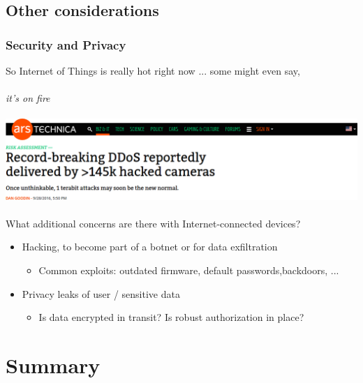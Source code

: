 \documentclass{beamer}
\begin{document}
\subsection{Other considerations}
\begin{frame}[fragile]
\frametitle{Security and Privacy}
So Internet of Things is really hot right now ...
 {
some might even say, \\
\hfill \\
{\centering \textit{it's on fire} \\
}  {
\hfill \\
\includegraphics[width=0.7\columnwidth]{external/hacked-headline} \\
\hfill \\
What additional concerns are there with Internet-connected devices?
}
}

 {
\begin{itemize}
  \item Hacking, to become part of a botnet or for data exfiltration
  \begin{itemize}
    \item Common exploits: outdated firmware, default passwords,backdoors, ...
  \end{itemize}
  \item Privacy leaks of user / sensitive data
  \begin{itemize}
    \item Is data encrypted in transit? Is robust authorization in place?
  \end{itemize}
\end{itemize}
}
\end{frame}


\section{Summary} %
\end{document}
